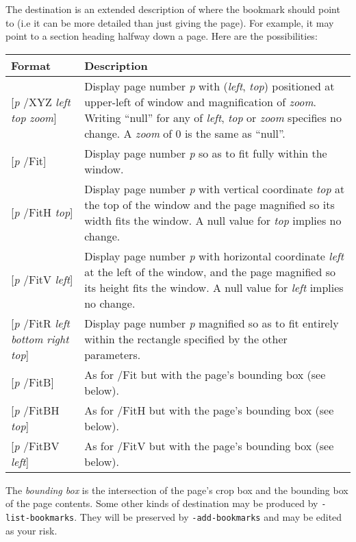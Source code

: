 \documentclass{book}
\begin{document}
The destination is an extended description of where the bookmark should point to (i.e it can be more detailed than just giving the page). For example, it may point to a section heading halfway down a page. Here are the possibilities:

\medskip

\begin{tabular}{lp{8cm}}
Format & Description\\\hline
{[\textit{p} /XYZ \textit{left} \textit{top} \textit{zoom}]} & Display page number \textit{p} with (\textit{left}, \textit{top}) positioned at upper-left of window and magnification of \textit{zoom}. Writing ``null'' for any of \textit{left}, \textit{top} or \textit{zoom} specifies no change. A \textit{zoom} of 0 is the same as ``null''.\\
{[\textit{p} /Fit]} & Display page number \textit{p} so as to fit fully within the window.\\
{[\textit{p} /FitH \textit{top}]} & Display page number \textit{p} with vertical coordinate \textit{top} at the top of the window and the page magnified so its width fits the window. A null value for \textit{top} implies no change.\\
{[\textit{p} /FitV \textit{left}]} & Display page number \textit{p} with horizontal coordinate \textit{left} at the left of the window, and the page magnified so its height fits the window. A null value for \textit{left} implies no change. \\
{[\textit{p} /FitR \textit{left} \textit{bottom} \textit{right} \textit{top}]} & Display page number \textit{p} magnified so as to fit entirely within the rectangle specified by the other parameters. \\
{[\textit{p} /FitB]} & As for /Fit but with the page's bounding box (see below).\\
{[\textit{p} /FitBH \textit{top}]} & As for /FitH but with the page's bounding box (see below).\\
{[\textit{p} /FitBV \textit{left}]} & As for /FitV but with the page's bounding box (see below).
\end{tabular}

\medskip

\noindent The \textit{bounding box} is the intersection of the page's crop box and the bounding box of the page contents. Some other kinds of destination may be produced by \texttt{-list-bookmarks}. They will be preserved by \texttt{-add-bookmarks} and may be edited as your risk.
\end{document}
